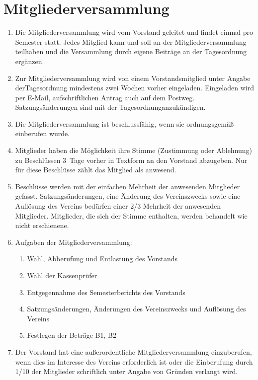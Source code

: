 \documentclass[a4paper]{scrartcl}
\begin{document}
\section{Mitgliederversammlung}
\begin{enumerate}
    \item Die Mitgliederversammlung wird vom Vorstand geleitet und findet
          einmal pro Semester statt. Jedes Mitglied kann und soll an der
          Mitgliederversammlung teilhaben und die Versammlung durch eigene Beiträge an
          der Tagesordnung ergänzen.
    \item Zur Mitgliederversammlung wird von einem Vorstandsmitglied unter
          Angabe derTagesordnung mindestens zwei Wochen vorher eingeladen.
          Eingeladen wird per E-Mail, aufschriftlichen Antrag auch auf dem
          Postweg. Satzungsänderungen sind mit der Tagesordnunganzukündigen.
    \item Die Mitgliederversammlung ist beschlussfähig, wenn sie ordnungsgemäß
          einberufen wurde.
    \item Mitglieder haben die Möglichkeit ihre Stimme (Zustimmung oder
          Ablehnung) zu Beschlüssen 3~Tage vorher in Textform an den Vorstand
          abzugeben. Nur für diese Beschlüsse zählt das Mitglied als anwesend.
    \item Beschlüsse werden mit der einfachen Mehrheit der anwesenden Mitglieder gefasst.
          Satzungsänderungen, eine Änderung des Vereinszwecks sowie eine
          Auflösung des Vereins bedürfen einer 2/3 Mehrheit der anwesenden
          Mitglieder. Mitglieder, die sich der Stimme enthalten, werden
          behandelt wie nicht erschienene.
    \item Aufgaben der Mitgliederversammlung:
        \begin{enumerate}
            \item Wahl, Abberufung und Entlastung des Vorstands
            \item Wahl der Kassenprüfer
            \item Entgegennahme des Semesterberichts des Vorstands
            \item Satzungsänderungen, Änderungen des Vereinszwecks und
                  Auflösung des Vereins
            \item Festlegen der Beträge B1, B2
        \end{enumerate}
    \item Der Vorstand hat eine außerordentliche Mitgliederversammlung
          einzuberufen, wenn dies im Interesse des Vereins erforderlich ist
          oder die Einberufung durch 1/10 der Mitglieder schriftlich unter
          Angabe von Gründen verlangt wird.
\end{enumerate}
\end{document}
